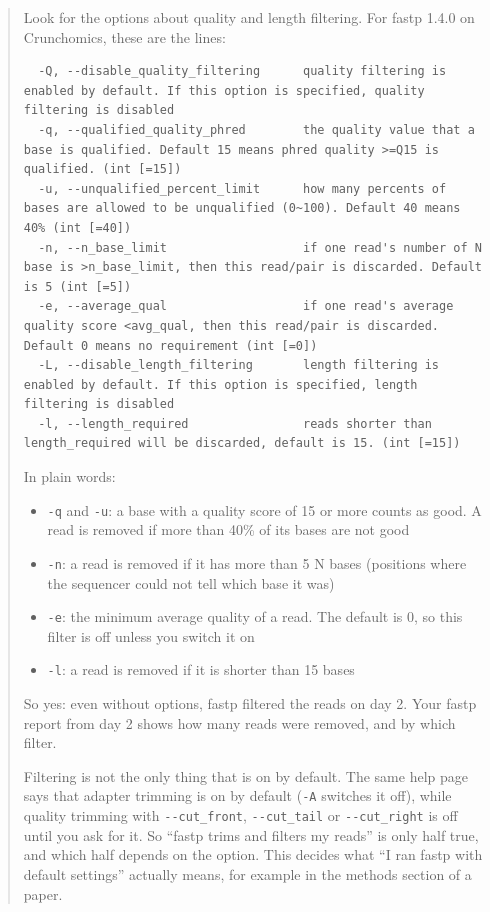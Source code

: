 \documentclass[
  letterpaper,
  DIV=11,
  numbers=noendperiod]{scrreprt}
\providecommand{\tightlist}{%
  \setlength{\itemsep}{0pt}\setlength{\parskip}{0pt}}
\begin{document}
\begin{tcolorbox}
\begin{quote}
Look for the options about quality and length filtering. For fastp 1.4.0
on Crunchomics, these are the lines:

\begin{verbatim}
  -Q, --disable_quality_filtering      quality filtering is enabled by default. If this option is specified, quality filtering is disabled
  -q, --qualified_quality_phred        the quality value that a base is qualified. Default 15 means phred quality >=Q15 is qualified. (int [=15])
  -u, --unqualified_percent_limit      how many percents of bases are allowed to be unqualified (0~100). Default 40 means 40% (int [=40])
  -n, --n_base_limit                   if one read's number of N base is >n_base_limit, then this read/pair is discarded. Default is 5 (int [=5])
  -e, --average_qual                   if one read's average quality score <avg_qual, then this read/pair is discarded. Default 0 means no requirement (int [=0])
  -L, --disable_length_filtering       length filtering is enabled by default. If this option is specified, length filtering is disabled
  -l, --length_required                reads shorter than length_required will be discarded, default is 15. (int [=15])
\end{verbatim}

In plain words:

\begin{itemize}
\tightlist
\item
  \texttt{-q} and \texttt{-u}: a base with a quality score of 15 or more
  counts as good. A read is removed if more than 40\% of its bases are
  not good
\item
  \texttt{-n}: a read is removed if it has more than 5 N bases
  (positions where the sequencer could not tell which base it was)
\item
  \texttt{-e}: the minimum average quality of a read. The default is 0,
  so this filter is off unless you switch it on
\item
  \texttt{-l}: a read is removed if it is shorter than 15 bases
\end{itemize}

So yes: even without options, fastp filtered the reads on day 2. Your
fastp report from day 2 shows how many reads were removed, and by which
filter.

Filtering is not the only thing that is on by default. The same help
page says that adapter trimming is on by default (\texttt{-A} switches
it off), while quality trimming with \texttt{-\/-cut\_front},
\texttt{-\/-cut\_tail} or \texttt{-\/-cut\_right} is off until you ask
for it. So ``fastp trims and filters my reads'' is only half true, and
which half depends on the option. This decides what ``I ran fastp with
default settings'' actually means, for example in the methods section of
a paper.


\end{quote}
\end{tcolorbox}
\end{document}
